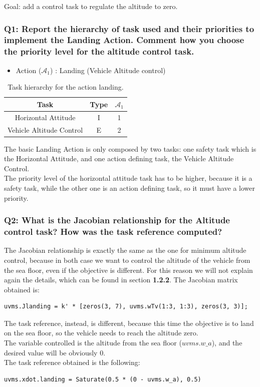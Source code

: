 \documentclass{article}
\begin{document}
Goal: add a control task to regulate the altitude to zero.

\subsubsection{Q1: Report the hierarchy of task used and their priorities to implement the Landing Action. Comment how you choose the priority level for the altitude control task.}
\begin{table}[htb]
	\caption{Task hierarchy for the action landing.}
	\begin{itemize}
		\item Action ($\mathcal{A}_{1}$) : Landing (Vehicle Altitude control)
	\end{itemize}
	\label{tb_align:actions_table_2_1}
	\begin{center}
		\footnotesize
		\begin{tabular}{ccc}
			\toprule
			Task & Type & $\mathcal{A}_{1}$ \\
			\midrule
			Horizontal Attitude             & I & 1 \\
			\hdashline
			Vehicle Altitude Control        & E & 2 \\
			\bottomrule
		\end{tabular}
	\end{center}
\end{table}
The basic Landing Action is only composed by two tasks: one safety task which is the Horizontal Attitude, and one action defining task, the Vehicle Altitude Control.\\
The priority level of the horizontal attitude task has to be higher, because it is a safety task, while the other one is an action defining task, so it must have a lower priority.

\subsubsection{Q2: What is the Jacobian relationship for the Altitude control task? How was the task reference computed?}
The Jacobian relationship is exactly the same as the one for minimum altitude control, because in both case we want to control the altitude of the vehicle from the sea floor, even if the objective is different. For this reason we will not explain again the details, which can be found in section \textbf{1.2.2}.
The Jacobian matrix obtained is:
\begin{lstlisting}
uvms.Jlanding = k' * [zeros(3, 7), uvms.wTv(1:3, 1:3), zeros(3, 3)];
\end{lstlisting}
The task reference, instead, is different, because this time the objective is to land on the sea floor, so the vehicle needs to reach the altitude zero.\\ 
The variable controlled is the altitude from the sea floor (\(uvms.w\_a\)), and the desired value will be obviously 0.\\
The task reference obtained is the following:
\begin{lstlisting}
uvms.xdot.landing = Saturate(0.5 * (0 - uvms.w_a), 0.5) 
\end{lstlisting}
\end{document}
